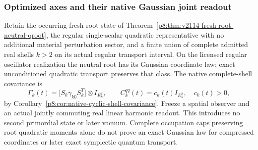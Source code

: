 \documentclass[12pt,a4paper]{article}
\begin{document}


\subsubsection{Optimized axes and their native Gaussian joint readout}
\label{p8:sec:v2189-sky-optimized-axis-joint}

Retain the occurring fresh-root state of
Theorem~\ref{p8:thm:v2114-fresh-root-neutral-qroot}, the regular
single-scalar quadratic representative with no additional material
perturbation sector, and a finite union of complete admitted real shells
$k>2$ on its actual regular transport interval. On the licensed regular
oscillator realization the neutral root has its Gaussian coordinate law;
exact unconditioned quadratic transport preserves that class. The native
complete-shell covariance is
\[
 \Gamma_k(t)=\bigl[S_k\gamma_{k0}S_k^T\bigr]\otimes I_{E_k^x},
 \qquad C_k^{qq}(t)=c_k(t)I_{E_k^x},\quad c_k(t)>0,
\]
by Corollary~\ref{p8:cor:native-cyclic-shell-covariance}.
Freeze a spatial observer and an actual jointly commuting real linear
harmonic readout. This introduces no second primordial state or later
vacuum. Complete occupation caps preserving root quadratic moments alone
do not prove an exact Gaussian law for compressed coordinates or later
exact symplectic quantum transport.
\end{document}
